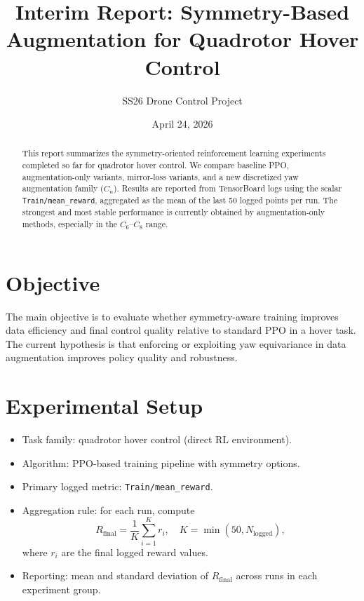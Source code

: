 \documentclass[11pt]{article}
\title{Interim Report: Symmetry-Based Augmentation for Quadrotor Hover Control}
\author{SS26 Drone Control Project}
\date{April 24, 2026}
\begin{document}
\maketitle

\begin{abstract}
This report summarizes the symmetry-oriented reinforcement learning experiments completed so far for quadrotor hover control. We compare baseline PPO, augmentation-only variants, mirror-loss variants, and a new discretized yaw augmentation family ($C_n$). Results are reported from TensorBoard logs using the scalar \texttt{Train/mean\_reward}, aggregated as the mean of the last 50 logged points per run. The strongest and most stable performance is currently obtained by augmentation-only methods, especially in the $C_6$--$C_8$ range.
\end{abstract}

\section{Objective}
The main objective is to evaluate whether symmetry-aware training improves data efficiency and final control quality relative to standard PPO in a hover task. The current hypothesis is that enforcing or exploiting yaw equivariance in data augmentation improves policy quality and robustness.

\section{Experimental Setup}
\begin{itemize}
    \item Task family: quadrotor hover control (direct RL environment).
    \item Algorithm: PPO-based training pipeline with symmetry options.
    \item Primary logged metric: \texttt{Train/mean\_reward}.
    \item Aggregation rule: for each run, compute
    \[
        R_{\text{final}} = \frac{1}{K}\sum_{i=1}^{K} r_i, \quad K=\min(50, N_{\text{logged}}),
    \]
    where $r_i$ are the final logged reward values.
    \item Reporting: mean and standard deviation of $R_{\text{final}}$ across runs in each experiment group.
\end{itemize}
\end{document}
